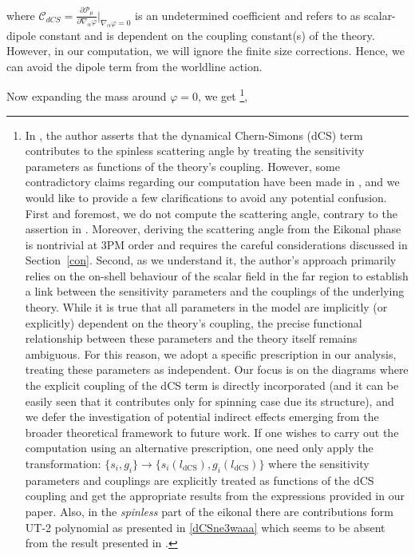 where $\mathcal{C}_{dCS}=\frac{\partial \mathcal{P_{\mu}}}{\partial{\nabla_{\alpha}\varphi}}\Bigg|_{\nabla_\alpha\varphi=0}$ is an undetermined coefficient and refers to as scalar-dipole constant and is dependent on the coupling constant(s) of the theory. However, in our computation, we will ignore the finite size corrections. Hence, we can avoid the dipole term from the worldline action.  \par 
Now expanding the mass around $\varphi=0$, we get \footnote{In \cite{Wilson-Gerow:2025xhr}, the author asserts that the dynamical Chern-Simons (dCS) term contributes to the spinless scattering angle by treating the sensitivity parameters as functions of the theory's coupling. However, some contradictory claims regarding our computation have been made in \cite{Wilson-Gerow:2025xhr}, and we would like to provide a few clarifications to avoid any potential confusion. First and foremost, we do not compute the scattering angle, contrary to the assertion in \cite{Wilson-Gerow:2025xhr}. Moreover, deriving the scattering angle from the Eikonal phase is nontrivial at 3PM order and requires the careful considerations discussed in Section~\eqref{con}. Second, as we understand it, the author's approach primarily relies on the on-shell behaviour of the scalar field in the far region to establish a link between the sensitivity parameters and the couplings of the underlying theory. While it is true that all parameters in the model are implicitly (or explicitly) dependent on the theory's coupling, the precise functional relationship between these parameters and the theory itself remains ambiguous. For this reason, we adopt a specific prescription in our analysis, treating these parameters as independent. 
Our focus is on the diagrams where the explicit coupling of the dCS term is directly incorporated (and it can be easily seen that it contributes only for spinning case due its structure), and we defer the investigation of potential indirect effects emerging from the broader theoretical framework to future work. If one wishes to carry out the computation using an alternative prescription, one need only apply the transformation:  
   $ \{s_i, g_i\} \to \{s_i(l_{\textrm{dCS}}), g_i(l_{\textrm{dCS}})\}$
where the sensitivity parameters and couplings are explicitly treated as functions of the dCS coupling and get the appropriate results from the expressions provided in our paper. Also, in the \textit{spinless} part of the eikonal there are contributions form UT-2 polynomial as presented in \eqref{dCSne3waaa} which seems to be absent from the result presented in \cite{Wilson-Gerow:2025xhr}.  },
